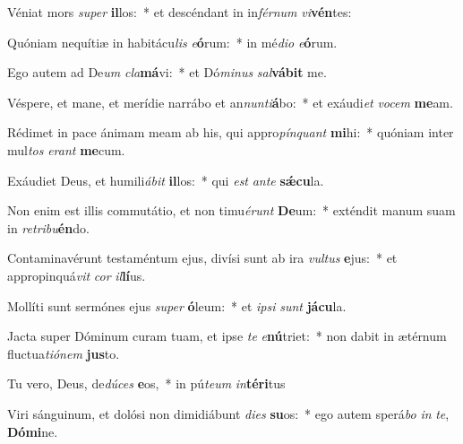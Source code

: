 \item Véniat mors \textit{su}\textit{per} \textbf{il}los:~* et descéndant in in\textit{fér}\textit{num} \textit{vi}\textbf{vén}tes:
\item Quóniam nequítiæ in habitácu\textit{lis} \textit{e}\textbf{ó}rum:~* in mé\textit{di}\textit{o} \textit{e}\textbf{ó}rum.
\item Ego autem ad De\textit{um} \textit{cla}\textbf{má}vi:~* et Dó\textit{mi}\textit{nus} \textit{sal}\textbf{vá}\textbf{bit} me.
\item Véspere, et mane, et merídie narrábo et an\textit{nun}\textit{ti}\textbf{á}bo:~* et exáudi\textit{et} \textit{vo}\textit{cem} \textbf{me}am.
\item Rédimet in pace ánimam meam ab his, qui appro\textit{pín}\textit{quant} \textbf{mi}hi:~* quóniam inter mul\textit{tos} \textit{e}\textit{rant} \textbf{me}cum.
\item Exáudiet Deus, et humili\textit{á}\textit{bit} \textbf{il}los:~* qui \textit{est} \textit{an}\textit{te} \textbf{sǽ}\textbf{cu}la.
\item Non enim est illis commutátio, et non timu\textit{é}\textit{runt} \textbf{De}um:~* exténdit manum suam in \textit{re}\textit{tri}\textit{bu}\textbf{én}do.
\item Contaminavérunt testaméntum ejus, divísi sunt ab ira \textit{vul}\textit{tus} \textbf{e}jus:~* et appropinquá\textit{vit} \textit{cor} \textit{il}\textbf{lí}us.
\item Mollíti sunt sermónes ejus \textit{su}\textit{per} \textbf{ó}leum:~* et \textit{ip}\textit{si} \textit{sunt} \textbf{já}\textbf{cu}la.
\item Jacta super Dóminum curam tuam, et ipse \textit{te} \textit{e}\textbf{nú}triet:~* non dabit in ætérnum fluctua\textit{ti}\textit{ó}\textit{nem} \textbf{jus}to.
\item Tu vero, Deus, de\textit{dú}\textit{ces} \textbf{e}os,~* in pú\textit{te}\textit{um} \textit{in}\textbf{tér}\textbf{i}tus
\item Viri sánguinum, et dolósi non dimidiábunt \textit{di}\textit{es} \textbf{su}os:~* ego autem sperá\textit{bo} \textit{in} \textit{te}, \textbf{Dó}\textbf{mi}ne.
